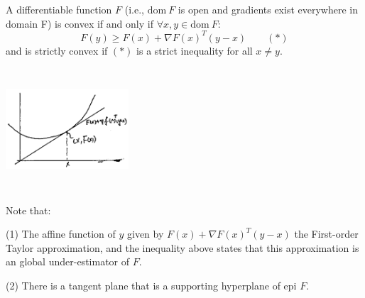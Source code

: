 \begin{theorem}
	A differentiable function $F$ (i.e., $\text{dom}\ F$ is open and gradients exist everywhere in domain F) is convex if and only if $\forall x,y\in \text{dom}\ F$:
	\begin{equation*}
	F(y)\geq F(x) + \nabla F(x)^T(y-x) \qquad (*)
	\end{equation*}
	and is strictly convex if $(*)$ is a strict inequality for all $x\neq y$.
\end{theorem}
	\begin{marginfigure}
	\centering
	\includegraphics[width=1.8in,height=1.8in]{figures/ch08/figure1106_1.png}
	\end{marginfigure}
	Note that:
	
	(1) The affine function of $y$ given by $F(x) + \nabla F(x)^T(y-x)$ the First-order Taylor approximation, and the inequality above states that this approximation is an global under-estimator of $F$.
	
	(2) There is a tangent plane that is a supporting hyperplane of epi $F$.

